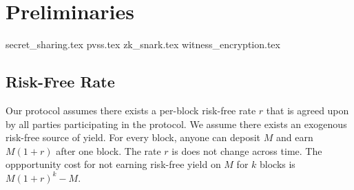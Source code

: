 \section{Preliminaries}
    {secret_sharing.tex}
    {pvss.tex}
    {zk_snark.tex}
    {witness_encryption.tex}
    \subsection{Risk-Free Rate}
    Our protocol assumes there exists a per-block risk-free rate $r$ that is agreed upon by all parties participating in the protocol.
    We assume there exists an exogenous risk-free source of yield.
    For every block, anyone can deposit $M$ and earn $M(1 + r)$ after one block.
    The rate $r$ is does not change across time.
    The oppportunity cost for not earning risk-free yield on $M$ for $k$ blocks is $M(1 + r)^k - M$.

